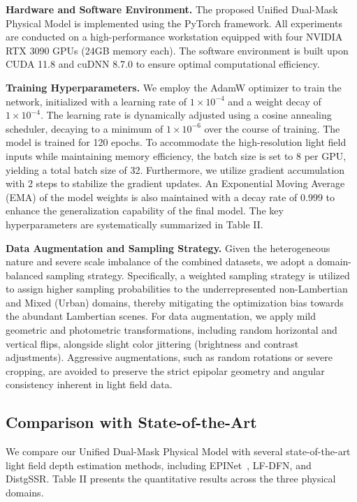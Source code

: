 \documentclass[lettersize,journal]{IEEEtran}
\begin{document}
\textbf{Hardware and Software Environment.} 
The proposed Unified Dual-Mask Physical Model is implemented using the PyTorch framework. All experiments are conducted on a high-performance workstation equipped with four NVIDIA RTX 3090 GPUs (24GB memory each). The software environment is built upon CUDA 11.8 and cuDNN 8.7.0 to ensure optimal computational efficiency.

\textbf{Training Hyperparameters.} 
We employ the AdamW optimizer to train the network, initialized with a learning rate of $1 \times 10^{-4}$ and a weight decay of $1 \times 10^{-4}$. The learning rate is dynamically adjusted using a cosine annealing scheduler, decaying to a minimum of $1 \times 10^{-6}$ over the course of training. The model is trained for 120 epochs. To accommodate the high-resolution light field inputs while maintaining memory efficiency, the batch size is set to 8 per GPU, yielding a total batch size of 32. Furthermore, we utilize gradient accumulation with 2 steps to stabilize the gradient updates. An Exponential Moving Average (EMA) of the model weights is also maintained with a decay rate of 0.999 to enhance the generalization capability of the final model. The key hyperparameters are systematically summarized in Table II.

\textbf{Data Augmentation and Sampling Strategy.} 
Given the heterogeneous nature and severe scale imbalance of the combined datasets, we adopt a domain-balanced sampling strategy. Specifically, a weighted sampling strategy is utilized to assign higher sampling probabilities to the underrepresented non-Lambertian and Mixed (Urban) domains, thereby mitigating the optimization bias towards the abundant Lambertian scenes. For data augmentation, we apply mild geometric and photometric transformations, including random horizontal and vertical flips, alongside slight color jittering (brightness and contrast adjustments). Aggressive augmentations, such as random rotations or severe cropping, are avoided to preserve the strict epipolar geometry and angular consistency inherent in light field data.

\subsection{Comparison with State-of-the-Art}

We compare our Unified Dual-Mask Physical Model with several state-of-the-art light field depth estimation methods, including EPINet~\cite{vaswani2017}, LF-DFN, and DistgSSR. Table II presents the quantitative results across the three physical domains. 
\end{document}
